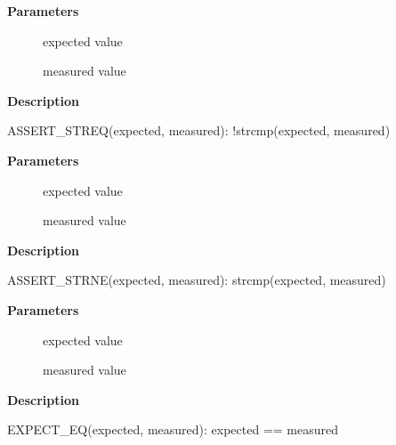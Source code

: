 \documentclass[a4paper,8pt,english]{sphinxmanual}
\begin{document}
\textbf{Parameters}
\begin{description}
\item[{}] \leavevmode
expected value

\item[{}] \leavevmode
measured value

\end{description}

\textbf{Description}

ASSERT\_STREQ(expected, measured): !strcmp(expected, measured)

\begin{fulllineitems}
\label{dev-tools/kselftest:c.ASSERT_STRNE}
\end{fulllineitems}


\textbf{Parameters}
\begin{description}
\item[{}] \leavevmode
expected value

\item[{}] \leavevmode
measured value

\end{description}

\textbf{Description}

ASSERT\_STRNE(expected, measured): strcmp(expected, measured)

\begin{fulllineitems}
\label{dev-tools/kselftest:c.EXPECT_EQ}
\end{fulllineitems}


\textbf{Parameters}
\begin{description}
\item[{}] \leavevmode
expected value

\item[{}] \leavevmode
measured value

\end{description}

\textbf{Description}

EXPECT\_EQ(expected, measured): expected == measured

\begin{fulllineitems}
\label{dev-tools/kselftest:c.EXPECT_NE}
\end{fulllineitems}
\end{document}
